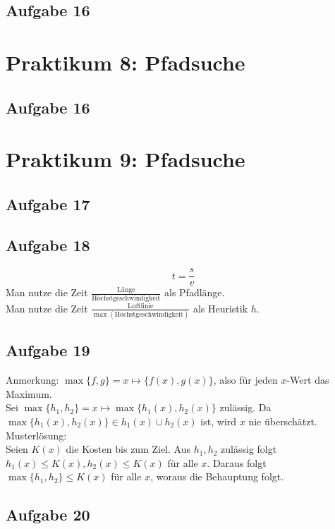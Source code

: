 \documentclass{scrreprt}
\begin{document}
\section{Aufgabe 16}


\chapter{Praktikum 8: Pfadsuche}
\section{Aufgabe 16}

\chapter{Praktikum 9: Pfadsuche}
\section{Aufgabe 17}

\section{Aufgabe 18}
$$t=\frac{s}{v}$$
Man nutze die Zeit $\frac{\text{Länge}}{\text{Höchstgeschwindigkeit}}$ als Pfadlänge.\\
Man nutze die Zeit $\frac{\text{Luftlinie}}{\max(\text{Höchstgeschwindigkeit})}$ als Heuristik $h$.

\section{Aufgabe 19}
Anmerkung: $\max\{f,g\}=x\mapsto \{f(x), g(x)\}$, also für jeden $x$-Wert das Maximum.\\
Sei $\max\{h_1, h_2\}=x \mapsto \max\{h_1(x), h_2(x)\}$ zulässig. Da $\max\{h_1(x), h_2(x)\}\in h_1(x) \cup h_2(x)$ ist, wird $x$ nie überschätzt.\bigskip\\
Musterlösung:\\
Seien $K(x)$ die Kosten bis zum Ziel. Aus $h_1, h_2$ zulässig folgt $h_1(x)\leq K(x), h_2(x)\leq K(x)$ für alle $x$. Daraus folgt $\max\{h_1, h_2\} \leq K(x)$ für alle $x$, woraus die Behauptung folgt. 


\section{Aufgabe 20}
\end{document}

